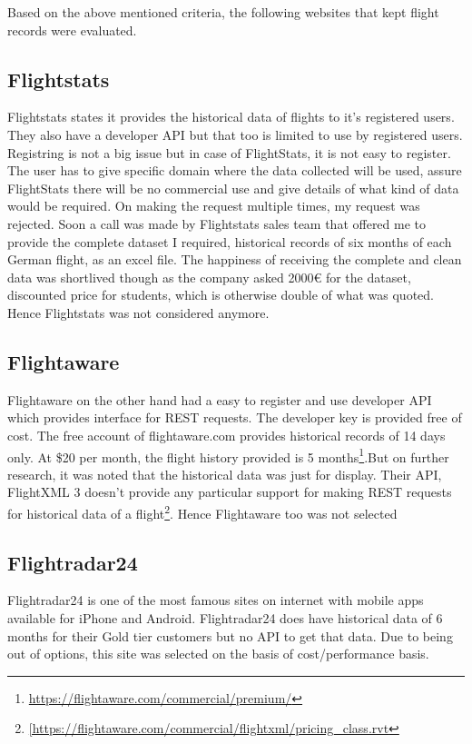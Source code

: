 Based on the above mentioned criteria, the following websites that kept flight records were evaluated.

\subsection{Flightstats}
Flightstats states it provides the historical data of flights to it's registered users. They also have a developer API but that too is limited to use by registered users. Registring is not a big issue but in case of FlightStats, it is not easy to register. The user has to give specific domain where the data collected will be used, assure FlightStats there will be no commercial use and give details of what kind of data would be required. On making the request multiple times, my request was rejected. Soon a call was made by Flightstats sales team that offered me to provide the complete dataset I required, historical records of six months of each German flight, as an excel file. The happiness of receiving the complete and clean data was shortlived though as the company asked 2000€ for the dataset, discounted price for students, which is otherwise double of what was quoted. Hence Flightstats was not considered anymore.

\subsection{Flightaware}
Flightaware on the other hand had a easy to register and use developer API which provides interface for REST requests. The developer key is provided free of cost. The free account of flightaware.com provides historical records of 14 days only. At \$20 per month, the flight history provided is 5 months\footnote{\url{https://flightaware.com/commercial/premium/}}.But on further research, it was noted that  the historical data was just for display. Their API, FlightXML 3 doesn't provide any particular support for making REST requests for historical data of a flight\footnote{\url{[https://flightaware.com/commercial/flightxml/pricing_class.rvt}}.
Hence Flightaware too was not selected

\subsection{Flightradar24}
Flightradar24 is one of the most famous sites on internet with mobile apps available for iPhone and Android. Flightradar24 does have historical data of 6 months for their Gold tier customers but no API to get that data. Due to being out of options, this site was selected on the basis of cost/performance basis.

